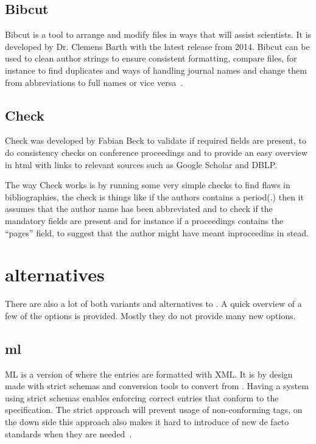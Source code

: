 \subsection{Bibcut}
Bibcut is a tool to arrange and modify {\bibtex} files in ways that
will assist scientists.  It is developed by Dr. Clemens Barth with the
latest release from 2014.  Bibcut can be used to clean author strings
to ensure consistent formatting, compare {\bibtex} files, for instance
to find duplicates and ways of handling journal names and change them
from abbreviations to full names or vice versa~\cite{bibcut_site}.


\subsection{{\bibtex} Check}
{\bibtex} Check was developed by Fabian Beck to validate if required
fields are present, to do consistency checks on conference proceedings
and to provide an easy overview in html with links to relevant sources
such as Google Scholar and DBLP.

The way {\bibtex} Check works is by running some very simple checks to
find flaws in bibliographies, the check is things like if the authors
contains a period(.) then it assumes that the author name has been
abbreviated and to check if the mandatory fields are present and for
instance if a proceedings contains the ``pages'' field, to suggest
that the author might have meant inproceedins in stead.


\section{{\bibtex} alternatives}
\label{sec:bibtex_alternatives}
There are also a lot of both variants and alternatives to {\bibtex}.
A quick overview of a few of the options is provided.  Mostly they do
not provide many new options.

\subsection{{\bibtex}ml} {\bibtex}ML is a version of {\bibtex} where
the entries are formatted with XML.  It is by design made with strict
schemas and conversion tools to convert from {\bibtex}.  Having a
system using strict schemas enables enforcing correct entries that
conform to the specification.  The strict approach will prevent usage
of non-conforming tags, on the down side this approach also makes it
hard to introduce of new de facto standards when they are
needed~\cite{gunhen2007_bibtexml}.

